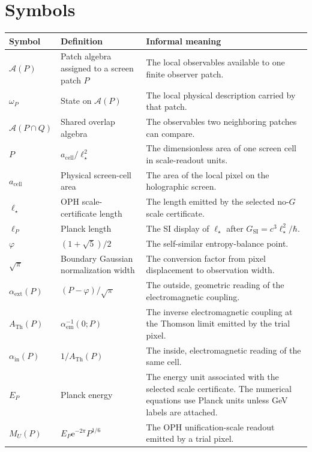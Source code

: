 \documentclass[11pt]{article}
\theoremstyle{remark}
\newcommand{\A}{\mathcal A}
\newcommand{\e}{\mathrm e}
\newcommand{\ATh}{A_{\mathrm{Th}}}
\begin{document}
\clearpage
\section{Symbols}

\begin{longtable}{@{}L{0.20\textwidth}L{0.32\textwidth}L{0.38\textwidth}@{}}
\toprule
Symbol & Definition & Informal meaning \\
\midrule
\endhead
\(\A(P)\) & Patch algebra assigned to a screen patch \(P\) & The local observables available to one finite observer patch. \\
\(\omega_P\) & State on \(\A(P)\) & The local physical description carried by that patch. \\
\(\A(P\cap Q)\) & Shared overlap algebra & The observables two neighboring patches can compare. \\
\(P\) & \(a_{\mathrm{cell}}/\ell_\star^2\) & The dimensionless area of one screen cell in scale-readout units. \\
\(a_{\mathrm{cell}}\) & Physical screen-cell area & The area of the local pixel on the holographic screen. \\
\(\ell_\star\) & OPH scale-certificate length & The length emitted by the selected no-\(G\) scale certificate. \\
\(\ell_P\) & Planck length & The SI display of \(\ell_\star\) after \(G_{\mathrm{SI}}=c^3\ell_\star^2/\hbar\). \\
\(\varphi\) & \((1+\sqrt5)/2\) & The self-similar entropy-balance point. \\
\(\sqrt\pi\) & Boundary Gaussian normalization width & The conversion factor from pixel displacement to observation width. \\
\(\alpha_{\mathrm{ext}}(P)\) & \((P-\varphi)/\sqrt\pi\) & The outside, geometric reading of the electromagnetic coupling. \\
\(\ATh(P)\) & \(\alpha_{\mathrm{em}}^{-1}(0;P)\) & The inverse electromagnetic coupling at the Thomson limit emitted by the trial pixel. \\
\(\alpha_{\mathrm{in}}(P)\) & \(1/\ATh(P)\) & The inside, electromagnetic reading of the same cell. \\
\(E_P\) & Planck energy & The energy unit associated with the selected scale certificate. The numerical equations use Planck units unless GeV labels are attached. \\
\(M_U(P)\) & \(E_P\e^{-2\pi}P^{1/6}\) & The OPH unification-scale readout emitted by a trial pixel. \\

\end{longtable}
\end{document}

